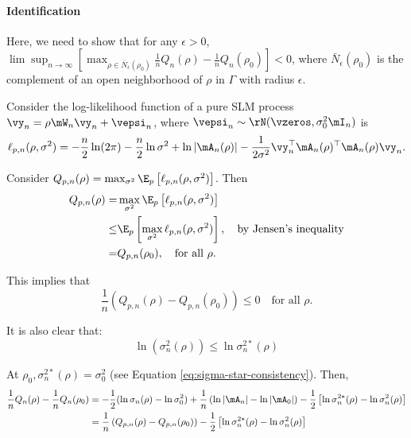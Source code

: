 \begin{subappendices}
\paragraph{Identification}

Here, we need to show that for any $\epsilon>0$, $\lim\sup_{n \to \infty}\left[\max_{\rho\in\bar{N}_{\epsilon}(\rho_0)}\frac{1}{n}Q_n(\rho) - \frac{1}{n}Q_n(\rho_0)\right]<0$, where $\bar{N}_{\epsilon}(\rho_0)$ is the complement of an open neighborhood of $\rho$ in $\Gamma$ with radius $\epsilon$.

Consider the log-likelihood function of a pure SLM process $\vy_n = \rho\mW_n\vy_n + \vepsi_n$, where $\vepsi_n \sim \rN(\vzeros, \sigma_0^2\mI_n)$ is
\begin{equation*}
\ell_{p, n}(\rho, \sigma^2)= -\frac{n}{2}\ln(2\pi) - \frac{n}{2}\ln\sigma^2 + \ln\left|\mA_n(\rho)\right|-\frac{1}{2\sigma^2}\vy_n^\top\mA_n(\rho)^\top\mA_n(\rho)\vy_n.
\end{equation*}

Consider $Q_{p,n}(\rho) = \max_{\sigma^2}\E_p\left[\ell_{p, n}(\rho, \sigma^2)\right]$. Then
\begin{equation*}
\begin{aligned}
  Q_{p,n}(\rho)  = &\max_{\sigma^2} \E_p\left[\ell_{p, n}(\rho, \sigma^2)\right] \\
                 \leq & \E_p\left[\max_{\sigma^2}\ell_{p, n}(\rho, \sigma^2)\right],\quad \mbox{by Jensen's inequality} \\
                  = & Q_{p, n}(\rho_0), \quad \mbox{for all $\rho$}. 
\end{aligned}
\end{equation*}

This implies that 
\begin{equation*}
  \frac{1}{n}\left(Q_{p,n}(\rho) - Q_{p, n}(\rho_0)\right)\leq 0 \quad \mbox{for all $\rho$}. 
\end{equation*}

It is also clear that:
\begin{equation}
\ln(\sigma_n^2(\rho)) \leq \ln\sigma_n^{2*}(\rho)
\end{equation}

At $\rho_0, \sigma^{2*}_n(\rho) = \sigma_0^2$ (see Equation \eqref{eq:sigma-star-consistency}). Then, 
\begin{equation*}
\begin{aligned}
\frac{1}{n}Q_n(\rho) - \frac{1}{n}Q_n(\rho_0) & = -\frac{1}{2}(\ln \sigma_n(\rho) - \ln \sigma_0^2) + \frac{1}{n}\left(\ln \left|\mA_n\right| - \ln \left|\mA_0\right|\right)- \frac{1}{2}\left[\ln \sigma_n^{2*}(\rho) - \ln \sigma_n^2(\rho)\right] \\
& = \frac{1}{n}\left(Q_{p,n}(\rho) - Q_{p, n}(\rho_0)\right)- \frac{1}{2}\left[\ln \sigma_n^{2*}(\rho) - \ln \sigma_n^2(\rho)\right] 
\end{aligned}
\end{equation*}


\end{subappendices}
